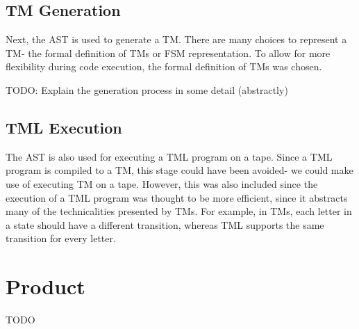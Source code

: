 

\subsection{TM Generation}
Next, the AST is used to generate a TM. There are many choices to represent a TM- the formal definition of TMs or FSM representation. To allow for more flexibility during code execution, the formal definition of TMs was chosen. 

TODO: Explain the generation process in some detail (abstractly)

\subsection{TML Execution}

The AST is also used for executing a TML program on a tape. Since a TML program is compiled to a TM, this stage could have been avoided- we could make use of executing TM on a tape. However, this was also included since the execution of a TML program was thought to be more efficient, since it abstracts many of the technicalities presented by TMs. For example, in TMs, each letter in a state should have a different transition, whereas TML supports the same transition for every letter.


\section{Product}
TODO
